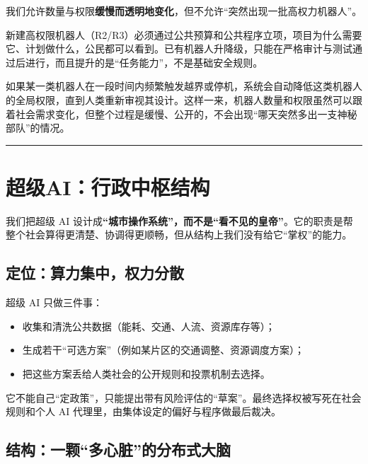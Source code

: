 我们允许数量与权限\textbf{缓慢而透明地变化}，但不允许``突然出现一批高权力机器人''。

新建高权限机器人（R2/R3）必须通过公共预算和公共程序立项，项目为什么需要它、计划做什么，公民都可以看到。已有机器人升降级，只能在严格审计与测试通过后进行，而且提升的是``任务能力''，不是基础安全规则。

如果某一类机器人在一段时间内频繁触发越界或停机，系统会自动降低这类机器人的全局权限，直到人类重新审视其设计。这样一来，机器人数量和权限虽然可以跟着社会需求变化，但整个过程是缓慢、公开的，不会出现``哪天突然多出一支神秘部队''的情况。

\begin{center}\rule{0.5\linewidth}{0.5pt}\end{center}

\section{超级AI：行政中枢结构}\label{ux8d85ux7ea7aiux884cux653fux4e2dux67a2ux7ed3ux6784}

我们把超级 AI 设计成\textbf{``城市操作系统''，而不是``看不见的皇帝''}。它的职责是帮整个社会算得更清楚、协调得更顺畅，但从结构上我们没有给它``掌权''的能力。

\subsection{定位：算力集中，权力分散}\label{ux5b9aux4f4dux7b97ux529bux96c6ux4e2dux6743ux529bux5206ux6563}

超级 AI 只做三件事：

\begin{itemize}
\item
  收集和清洗公共数据（能耗、交通、人流、资源库存等）；
\item
  生成若干``可选方案''（例如某片区的交通调整、资源调度方案）；
\item
  把这些方案丢给人类社会的公开规则和投票机制去选择。
\end{itemize}

它不能自己``定政策''，只能提出带有风险评估的``草案''。最终选择权被写死在社会规则和个人 AI 代理里，由集体设定的偏好与程序做最后裁决。

\subsection{结构：一颗``多心脏''的分布式大脑}\label{ux7ed3ux6784ux4e00ux9897ux591aux5fc3ux810fux7684ux5206ux5e03ux5f0fux5927ux8111}

